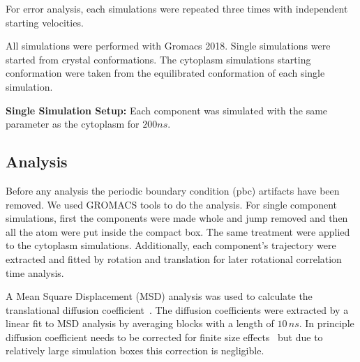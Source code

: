 \documentclass[journal=jacsat,manuscript=article]{achemso}
\begin{document}
For error analysis, each simulations were repeated three times with independent starting velocities.

All simulations were performed with Gromacs 2018. Single simulations were started from crystal conformations. The cytoplasm simulations starting conformation were taken from the equilibrated conformation of each single simulation.

{\bf Single Simulation Setup: } Each component was simulated with the same parameter as the cytoplasm for $200 ns$.

\subsection*{Analysis}
Before any analysis the periodic boundary condition (pbc) artifacts have been removed. We used GROMACS tools to do the analysis. For single component simulations, first the components were made whole and jump removed and then all the atom were put inside the compact box. The same treatment were applied to the cytoplasm simulations. Additionally, each component's trajectory were extracted and fitted by rotation and translation for later rotational correlation time analysis. 


A Mean Square Displacement (MSD) analysis was used to calculate the translational diffusion coefficient~\cite{Allen1987a}. The diffusion coefficients were extracted by a linear fit to MSD analysis by averaging blocks with a length of $10 \,ns$. In principle diffusion coefficient needs to be corrected for finite size effects~\cite{Yeh2004} but due to relatively large simulation boxes this correction is negligible.

\end{document}
